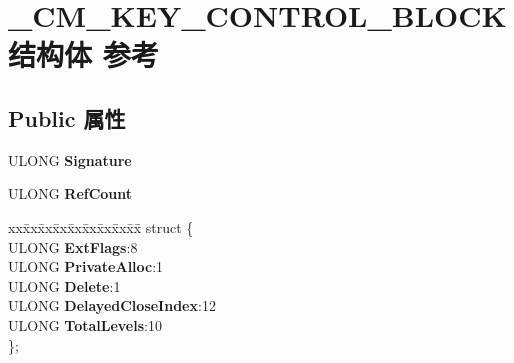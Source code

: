\hypertarget{struct___c_m___k_e_y___c_o_n_t_r_o_l___b_l_o_c_k}{}\section{\+\_\+\+C\+M\+\_\+\+K\+E\+Y\+\_\+\+C\+O\+N\+T\+R\+O\+L\+\_\+\+B\+L\+O\+C\+K结构体 参考}
\label{struct___c_m___k_e_y___c_o_n_t_r_o_l___b_l_o_c_k}
\subsection*{Public 属性}
\begin{DoxyCompactItemize}
\item 
\mbox{\label{struct___c_m___k_e_y___c_o_n_t_r_o_l___b_l_o_c_k_aa5f4d7f502cea1da1a00f6d17bf7c0da}} 
U\+L\+O\+NG {\bfseries Signature}
\item 
\mbox{\label{struct___c_m___k_e_y___c_o_n_t_r_o_l___b_l_o_c_k_a6e8ee0c5b8c8adfe3ed5173eb5477e82}} 
U\+L\+O\+NG {\bfseries Ref\+Count}
\item 
\mbox{\label{struct___c_m___k_e_y___c_o_n_t_r_o_l___b_l_o_c_k_ab4bea2afae033704097541e65d2174d3}} 
\begin{tabbing}
xx\=xx\=xx\=xx\=xx\=xx\=xx\=xx\=xx\=\kill
struct \{\\
\>ULONG {\bfseries ExtFlags}:8\\
\>ULONG {\bfseries PrivateAlloc}:1\\
\>ULONG {\bfseries Delete}:1\\
\>ULONG {\bfseries DelayedCloseIndex}:12\\
\>ULONG {\bfseries TotalLevels}:10\\
\}; \\


\end{tabbing}
\end{DoxyCompactItemize}
